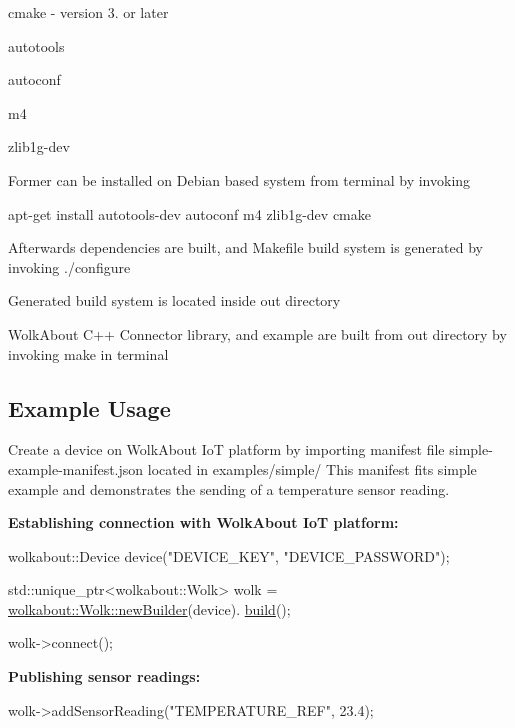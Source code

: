 \begin{DoxyItemize}
\item cmake -\/ version 3. or later
\item autotools
\item autoconf
\item m4
\item zlib1g-\/dev
\end{DoxyItemize}

Former can be installed on Debian based system from terminal by invoking

{\ttfamily apt-\/get install autotools-\/dev autoconf m4 zlib1g-\/dev cmake}

Afterwards dependencies are built, and Makefile build system is generated by invoking {\ttfamily ./configure}

Generated build system is located inside \textquotesingle{}out\textquotesingle{} directory

Wolk\+About C++ Connector library, and example are built from \textquotesingle{}out\textquotesingle{} directory by invoking {\ttfamily make} in terminal

\subsection*{Example Usage }

Create a device on Wolk\+About IoT platform by importing manifest file {\ttfamily simple-\/example-\/manifest.\+json} located in {\ttfamily examples/simple/} This manifest fits {\ttfamily simple} example and demonstrates the sending of a temperature sensor reading.

{\bfseries Establishing connection with Wolk\+About IoT platform\+:} 
\begin{DoxyCode}
wolkabout::Device device(\textcolor{stringliteral}{"DEVICE\_KEY"}, \textcolor{stringliteral}{"DEVICE\_PASSWORD"});

std::unique\_ptr<wolkabout::Wolk> wolk = \hyperlink{classwolkabout_1_1_wolk_a91270bb8552c2dee634e552111db4bb0}{wolkabout::Wolk::newBuilder}(device).
      \hyperlink{classwolkabout_1_1_wolk_builder_aad4c9b0c925a023cf670dc2fdc6631f3}{build}();

wolk->connect();
\end{DoxyCode}


{\bfseries Publishing sensor readings\+:} 
\begin{DoxyCode}
wolk->addSensorReading(\textcolor{stringliteral}{"TEMPERATURE\_REF"}, 23.4);
\end{DoxyCode}


